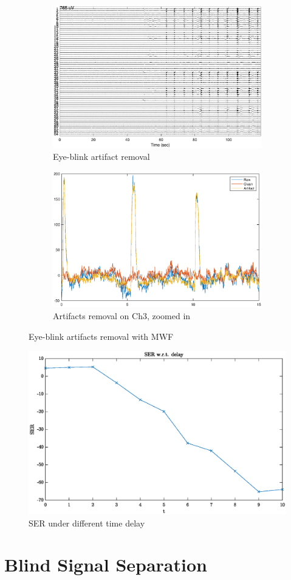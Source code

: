 \documentclass[pagesize,english,DIV=calc,footinclude=false
]{scrartcl}
\begin{document}
\begin{figure}[htbp]
  \centering
  \begin{subfigure}[b]{0.48\linewidth}
    \includegraphics[width=\linewidth]{blink_arti_rmv.eps}
    \caption{Eye-blink artifact removal}
  \end{subfigure}
  \begin{subfigure}[b]{0.48\linewidth}
    \includegraphics[width=\linewidth]{blink_arti_ch3.eps}
    \caption{Artifacts removal on Ch3, zoomed in}
  \end{subfigure}
  \caption{Eye-blink artifacts removal with MWF}
  \label{fig:blink}
\end{figure}

\begin{figure}[htbp]
  \centering
  \includegraphics[width=0.7\linewidth]{mwf_delay_ser.eps}
  \caption{SER under different time delay}
  \label{fig:ser_delay}
\end{figure}



\section{Blind Signal Separation}
\end{document}

